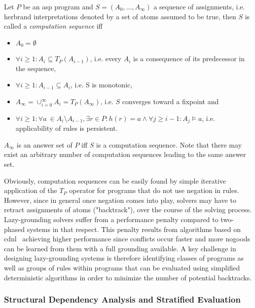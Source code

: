\begin{definition}
\label{def:prelims-asp-semantics-compseq}
Let $P$ be an \gls{asp} program and $S = (A_0,\ldots,A_{\infty})$ a sequence of assignments, i.e. herbrand interpretations denoted by a set of atoms assumed to be true, then $S$ is called a \emph{computation sequence} iff
\begin{itemize}
	\item $A_0 = \emptyset$
	\item $\forall i \geq 1: A_i \subseteq T_P(A_{i - 1})$, i.e. every $A_i$ is a consequence of its predecessor in the sequence,
	\item $\forall i \geq 1: A_{i - 1} \subseteq A_{i}$, i.e. S is monotonic,
	\item $A_{\infty} = \cup^{\infty}_{i = 0} A_i = T_P(A_{\infty})$, i.e. $S$ converges toward a fixpoint and
	\item $\forall i \geq 1: \forall a \ \in A_i \setminus A_{i - 1}, \exists r \in P: h(r) = a \land \forall j \geq i - 1: A_j \models a$, i.e. applicability of rules is persistent.
\end{itemize}
$A_{\infty}$ is an answer set of $P$ iff $S$ is a computation sequence. Note that there may exist an arbitrary number of computation sequences leading to the same answer set.
\end{definition}

Obviously, computation sequences can be easily found by simple iterative application of the $T_P$ operator for programs that do not use negation in rules. However, since in general once negation comes into play, solvers may have to retract assignments of atoms ("backtrack"), over the course of the solving process.  Lazy-grounding solvers suffer from a performance penalty compared to two-phased systems in that respect. This penalty results from algorithms based on \gls{cdnl}~\cite{clasp-cdnl} achieving higher performance since conflicts occur faster and more nogoods can be learned from them with a full grounding available. A key challenge in designing lazy-grounding systems is therefore identifying classes of programs as well as groups of rules within programs that can be evaluated using simplified deterministic algorithms in order to minimize the number of potential backtracks.

\subsubsection{Structural Dependency Analysis and Stratified Evaluation}

